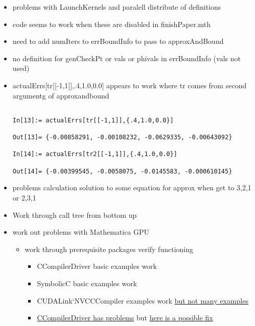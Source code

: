 \documentclass[hyperref,idxtotoc]{labbook}
\begin{document}
\begin{itemize}
\item problems  with LaunchKernels and paralell distribute of definitions
\item code seems to work when these are disabled in finishPaper.mth
\item need to add numIters to errBoundInfo to pass to approxAndBound
\item no definition for genCheckPt or vals or phivals in errBoundInfo (vals not used)
\item actualErrs[tr[[-1,1]],{.4,1.0,0.0}] appears to work where tr comes from second argumentg of approxandbound
\begin{verbatim}

In[13]:= actualErrs[tr[[-1,1]],{.4,1.0,0.0}]

Out[13]= {-0.00858291, -0.00108232, -0.0629335, -0.00643092}

In[14]:= actualErrs[tr2[[-1,1]],{.4,1.0,0.0}]

Out[14]= {-0.00399545, -0.0058075, -0.0145583, -0.000610145}

\end{verbatim}
\item problems calculation solution to some equation for approx when get to {3,2,1} or {2,3,1}
\end{itemize}




\begin{itemize}
\item Work through call tree from bottom up
\end{itemize}


   \begin{itemize}
   \item work out problems with Mathematica GPU
     \begin{itemize}
     \item work through prerequisite packages verify functioning
       \begin{itemize}
       \item CCompilerDriver basic examples work
       \item SymbolicC basic examples work
       \item CUDALink`NVCCCompiler examples work \href{https://reference.wolfram.com/language/CUDALink/ref/NVCCCompiler.html}{but not many examples}
       \item \href{https://reference.wolfram.com/language/CCompilerDriver/tutorial/CreatingExecutable.html#277035586}{CCompilerDriver has problems} but 
         \href{https://mathematica.stackexchange.com/questions/67787/a-bug-fix-to-mathematica-10-0-1-0}{here is a possible fix}
       \end{itemize}

     \end{itemize}

   \end{itemize}
\end{document}
